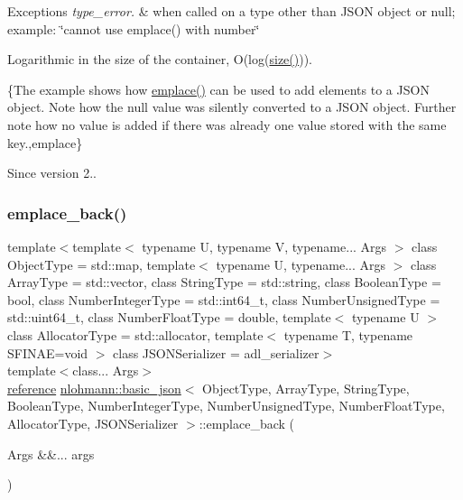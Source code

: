 \begin{DoxyExceptions}{Exceptions}
{\em type\+\_\+error.} & when called on a type other than J\+S\+ON object or null; example\+: {\ttfamily \char`\"{}cannot use emplace() with number\char`\"{}}\\
\hline
\end{DoxyExceptions}
Logarithmic in the size of the container, O(log({\ttfamily \mbox{\hyperlink{classnlohmann_1_1basic__json_a25e27ad0c6d53c01871c5485e1f75b96}{size()}}})).

\{The example shows how {\ttfamily \mbox{\hyperlink{classnlohmann_1_1basic__json_a5338e282d1d02bed389d852dd670d98d}{emplace()}}} can be used to add elements to a J\+S\+ON object. Note how the {\ttfamily null} value was silently converted to a J\+S\+ON object. Further note how no value is added if there was already one value stored with the same key.,emplace\}

\begin{DoxySince}{Since}
version 2.. 
\end{DoxySince}
\mbox{\label{classnlohmann_1_1basic__json_abf29131f898b05aad2c01a9c80e7a002}} 
\subsubsection{\texorpdfstring{emplace\+\_\+back()}{emplace\_back()}}
{\footnotesize\ttfamily template$<$template$<$ typename U, typename V, typename... Args $>$ class Object\+Type = std\+::map, template$<$ typename U, typename... Args $>$ class Array\+Type = std\+::vector, class String\+Type  = std\+::string, class Boolean\+Type  = bool, class Number\+Integer\+Type  = std\+::int64\+\_\+t, class Number\+Unsigned\+Type  = std\+::uint64\+\_\+t, class Number\+Float\+Type  = double, template$<$ typename U $>$ class Allocator\+Type = std\+::allocator, template$<$ typename T, typename S\+F\+I\+N\+A\+E=void $>$ class J\+S\+O\+N\+Serializer = adl\+\_\+serializer$>$ \\
template$<$class... Args$>$ \\
\mbox{\hyperlink{classnlohmann_1_1basic__json_ac6a5eddd156c776ac75ff54cfe54a5bc}{reference}} \mbox{\hyperlink{classnlohmann_1_1basic__json}{nlohmann\+::basic\+\_\+json}}$<$ Object\+Type, Array\+Type, String\+Type, Boolean\+Type, Number\+Integer\+Type, Number\+Unsigned\+Type, Number\+Float\+Type, Allocator\+Type, J\+S\+O\+N\+Serializer $>$\+::emplace\+\_\+back (\begin{DoxyParamCaption}\item[{Args \&\&...}]{args }\end{DoxyParamCaption})\hspace{0.3cm}{\ttfamily [inline]}}



